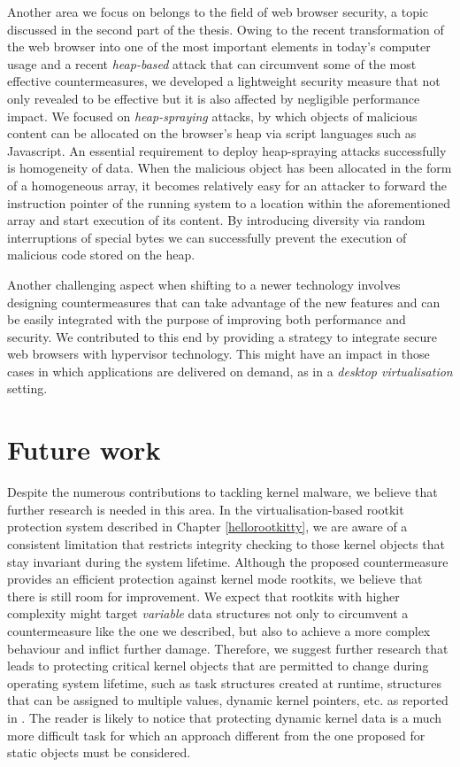 Another area we focus on belongs to the field of web browser security, a topic discussed in the second part of the thesis.
Owing to the recent transformation of the web browser into one of the most important elements in today's computer 
usage and a recent \emph{heap-based} attack that can circumvent some of the most effective countermeasures, we developed a lightweight security measure that not only revealed to be effective but it is also affected by negligible performance impact. We focused on \emph{heap-spraying} attacks, by which objects of malicious content can be allocated on the browser's heap via script languages such as Javascript. An essential requirement to deploy heap-spraying attacks successfully is homogeneity of data. When the malicious object has been allocated in the form of a homogeneous array, it becomes relatively easy for an attacker to forward the instruction pointer of the running system to a location within the aforementioned array and start execution of its content.
By introducing diversity via random interruptions of special bytes we can successfully prevent the execution of malicious code stored on the heap. 

Another challenging aspect when shifting to a newer technology involves designing countermeasures that can take 
advantage of the new features and can be easily integrated with the purpose of improving both performance and security. We contributed to this end by providing a strategy to integrate secure web browsers with hypervisor technology. This might have an impact in those cases in which applications are delivered on demand, as in a \emph{desktop virtualisation} setting.





\section{Future work}
Despite the numerous contributions to tackling kernel malware, we believe that further research is needed in this area. In the virtualisation-based rootkit protection system described in Chapter \ref{hellorootkitty}, we are aware of a consistent limitation that restricts integrity checking to those kernel objects that stay invariant during the system lifetime. 
Although the proposed countermeasure provides an efficient protection against kernel mode rootkits, we believe that there is still room for improvement. We expect that rootkits with higher complexity might target \emph{variable} data structures not only to circumvent a countermeasure like the one we described, but also to achieve a more complex behaviour and inflict further damage. Therefore, we suggest further research that leads to protecting critical kernel objects that are permitted to change during operating system lifetime, such as task structures created at runtime, structures that can be assigned to multiple values, dynamic kernel pointers, etc. as reported in \cite{dynamicdatakernel}. 
The reader is likely to notice that protecting dynamic kernel data is a much more difficult task for which an approach different from the one proposed for static objects must be considered. 

